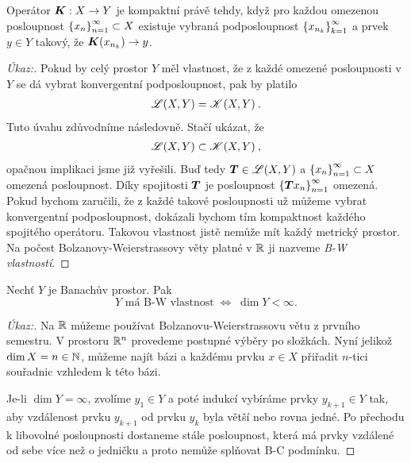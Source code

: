\begin{theorem}
Operátor $\boldsymbol{K} :X \to Y$ je kompaktní právě tehdy, když pro každou omezenou posloupnost $\left \lbrace x_n \right \rbrace_{n=1}^\infty \subset X$ existuje vybraná podposloupnost $\left \lbrace x_{n_k} \right \rbrace_{k=1}^\infty $ a prvek $y \in Y$ takový, že $\boldsymbol{K} ( x_{n_k}) \rightarrow y $.
\end{theorem}

\begin{proof}[Úkaz:]\qquad

Pokud by celý prostor $Y$ měl vlastnost, že z každé omezené posloupnosti v $Y$ se dá vybrat konvergentní podposloupnost, pak by platilo \begin{align*}
    \mathscr{L}(X,Y) = \mathscr{K} (X,Y) \:.
\end{align*}
Tuto úvahu zdůvodníme následovně. Stačí ukázat, že 
\begin{align*}
    \mathscr{L}(X,Y) \subset \mathscr{K} (X,Y) \:,
\end{align*}
opačnou implikaci jsme již vyřešili. Buď tedy $\boldsymbol{T} \in \mathscr{L}(X,Y)$ a $\left \lbrace x_n \right \rbrace_{n=1}^\infty \subset X$ omezená posloupnost.
Díky spojitosti $\boldsymbol{T}$ je posloupnost $ \left \lbrace  \boldsymbol{T} x_n \right \rbrace_{n=1}^\infty$ omezená. Pokud bychom zaručili, že z každé takové posloupnosti už můžeme vybrat konvergentní podposloupnost, dokázali bychom tím kompaktnost každého spojitého operátoru. Takovou vlastnost jistě nemůže mít každý metrický prostor. Na počest Bolzanovy-Weierstrassovy věty platné v $\mathbb{R}$ ji nazveme \emph{B-W vlastností}.
\end{proof}

\begin{lemma}
Nechť $Y$ je Banachův prostor. Pak 
$$Y\text{ má B-W vlastnost}\;\Leftrightarrow\;\dim Y<\infty.$$
\end{lemma}

\begin{proof}[Úkaz:]\qquad

\uv{$\Leftarrow$} Na $\mathbb{R}$ můžeme používat Bolzanovu-Weierstrassovu větu z prvního semestru. V prostoru $\mathbb{R}^n$ provedeme postupné výběry po složkách. Nyní jelikož $\dim X=n \in\mathbb{N}$, můžeme najít bázi a každému prvku $x \in X$ přiřadit $n$-tici souřadnic vzhledem k této bázi. 

\uv{$\Rightarrow$} Je-li $\dim Y=\infty$, zvolíme $y_1 \in Y$ a poté indukcí vybíráme prvky $y_{k+1} \in Y$ tak, aby vzdálenost prvku $y_{k+1}$ od prvku $y_k$ byla větší nebo rovna jedné. Po přechodu k libovolné posloupnosti dostaneme stále posloupnost, která má prvky vzdálené od sebe více než o jedničku a proto nemůže splňovat B-C podmínku.
\end{proof}

